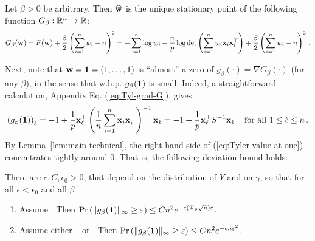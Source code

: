 \documentclass[times,sort&compress,3p]{elsarticle}
\begin{document}
\begin{lemma}\label{lem:Tyl-obs}
    Let $\beta>0$ be arbitrary. Then $\widehat{{\bf w}}$ is the unique stationary point of the following function $G_\beta:\mathbb{R}^n\to \mathbb{R}$:
    \begin{equation}\label{eq:Tyl-def-G}
        G_\beta({\bf w}) = F({\bf w}) + \frac{\beta}{2} \left( \sum_{i=1}^n w_i - n \right)^2 = -\sum_{i=1}^n \log w_i + \frac{n}{p}\log \det \left(\sum_{i=1}^n w_i {\bf x}_i{\bf x}_i^\top \right) + \frac{\beta}{2} \left( \sum_{i=1}^n w_i - n \right)^2 \,.
    \end{equation}
\end{lemma}
Next, note that ${\bf w}={\bf 1}=(1,\ldots,1)$ is ``almost'' a zero of $g_\beta(\cdot)=\nabla G_\beta(\cdot)$ (for any $\beta$), in the sense that w.h.p. $g_\beta({\bf 1})$ is small. Indeed, a straightforward calculation, Appendix Eq. (\ref{eq:Tyl-grad-G}), gives
\begin{equation}
    \label{eq:Tyler-value-at-one}
    \left(g_\beta({\bf 1})\right)_\ell = -1 + \frac{1}{p}{\bf x}_\ell^\top \left( \frac{1}{n}\sum_{i=1}^n{\bf x}_i{\bf x}_i^\top \right)^{-1}{\bf x}_\ell = -1 + \frac{1}{p}{\bf x}_\ell^\top S^{-1} {\bf x}_\ell \,\quad \textrm{for all } 1\le \ell \le n\,.
\end{equation}
By Lemma~\ref{lem:main-technical},
the right-hand-side of (\ref{eq:Tyler-value-at-one}) concentrates tightly around $0$. That is, the following deviation bound holds:
\begin{lemma}\label{lem:Tyl-almost-zero}
        There are $c,C,\epsilon_0>0$, that depend on the distribution of $Y$ and on  $\gamma$, so that for all $\epsilon<\epsilon_0$ and all $\beta$
        \begin{enumerate}
                
                \item 
                Assume \AssumLC. Then $\Pr\left(\|g_{\beta}({\bf 1})\|_\infty \geq \varepsilon\right) \leq  Cn^2e^{-c(\Psi_p\sqrt{n}) \varepsilon}$.
                
                
                \item 
                Assume either \AssumIndep~ or \AssumCCPSB. Then $\Pr\left(\|g_{\beta}({\bf 1})\|_\infty \geq \varepsilon\right)  \leq  C n^2 e^{-cn\varepsilon^2}$.
        \end{enumerate}
\end{lemma}
\end{document}
